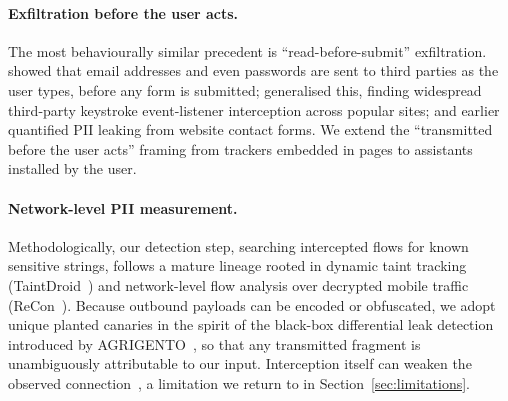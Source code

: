 \documentclass[sigconf,anonymous,review,balance=false]{acmart}
\begin{document}
\paragraph{Exfiltration before the user acts.}
The most behaviourally similar precedent is ``read-before-submit'' exfiltration.
\citet{senol2022leakyforms} showed that email addresses and even passwords are sent to
third parties as the user types, before any form is submitted; \citet{munir2025keystroke}
generalised this, finding widespread third-party keystroke event-listener interception
across popular sites; and \citet{starov2016contactforms} earlier quantified PII leaking
from website contact forms. We extend the ``transmitted before the user acts'' framing from
trackers embedded in pages to assistants installed by the user.

\paragraph{Network-level PII measurement.}
Methodologically, our detection step, searching intercepted flows for known sensitive
strings, follows a mature lineage rooted in dynamic taint tracking
(TaintDroid~\cite{enck2010taintdroid}) and network-level flow analysis over decrypted
mobile traffic (ReCon~\cite{ren2016recon}). Because outbound payloads can be encoded or
obfuscated, we adopt unique planted canaries in the spirit of the black-box differential
leak detection introduced by AGRIGENTO~\cite{continella2017agrigento}, so that any
transmitted fragment is unambiguously attributable to our input. Interception itself can
weaken the observed connection~\cite{durumeric2017https}, a limitation we return to in
Section~\ref{sec:limitations}.
\end{document}
